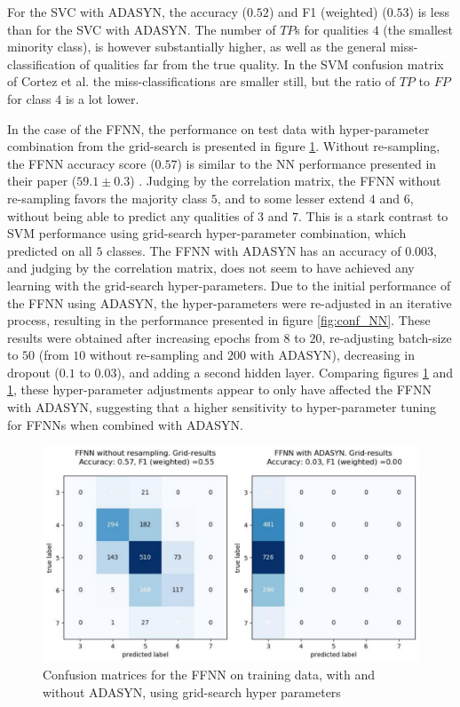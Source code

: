 \documentclass[%
oneside,                 %
final,                   %
10pt]{article}
\begin{document}
For the SVC with ADASYN, the accuracy ($0.52$) and F1 (weighted) ($0.53$) is less than for the SVC with ADASYN. The number of $TP$s for qualities $4$ (the smallest minority class), is however substantially higher, as well as the general miss-classification of qualities far from the true quality. In the SVM confusion matrix of Cortez et al. the miss-classifications are smaller still, but the ratio of $TP$ to $FP$ for class $4$ is a lot lower.

In the case of the FFNN, the performance on test data with hyper-parameter combination from the grid-search is presented in figure \ref{fig:conf_grid}. Without re-sampling, the FFNN accuracy score ($0.57$) is similar to the NN performance presented in their paper ($59.1 \pm 0.3$) \citep{CortezPaulo}. Judging by the correlation matrix, the FFNN without re-sampling favors the majority class $5$, and to some lesser extend $4$ and $6$, without being able to predict any qualities of $3$ and $7$. This is a stark contrast to SVM performance using grid-search hyper-parameter combination, which predicted on all $5$ classes.  The FFNN with ADASYN has an accuracy of $0.003$, and judging by the correlation matrix, does not seem to have achieved any learning with the grid-search hyper-parameters. Due to the initial performance of the FFNN using ADASYN, the hyper-parameters were re-adjusted in an iterative process, resulting in the performance presented in figure \ref{fig:conf_NN}. These results were obtained after increasing epochs from $8$ to $20$, re-adjusting batch-size to $50$ (from $10$ without re-sampling and $200$ with ADASYN), decreasing in dropout ($0.1$ to $0.03$), and adding a second hidden layer. Comparing figures \ref{fig:conf_grid} and \ref{fig:conf_grid}, these hyper-parameter adjustments appear to only have affected the FFNN with ADASYN, suggesting that a higher sensitivity to hyper-parameter tuning for FFNNs when combined with ADASYN.

\begin{figure}[!h]
        \centering 
         \includegraphics[scale=0.5]{../Results/confusions_NN_grid.pdf} 
          \caption{Confusion matrices for the FFNN on training data, with and without ADASYN, using grid-search hyper parameters}
        \label{fig:conf_grid}   
\end{figure}  
\end{document}
